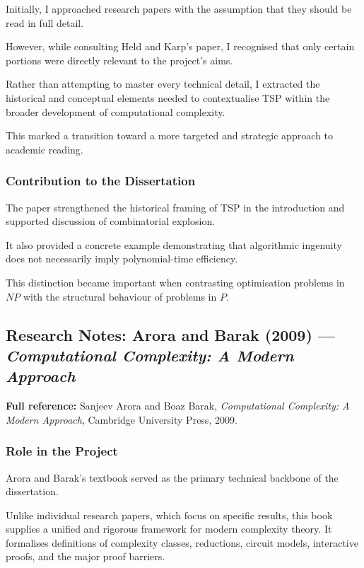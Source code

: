 \documentclass[12pt]{article}
\begin{document}
Initially, I approached research papers with the assumption that they should be read in full detail.

However, while consulting Held and Karp's paper, I recognised that only certain portions were directly relevant to the project's aims.

Rather than attempting to master every technical detail, I extracted the historical and conceptual elements needed to contextualise TSP within the broader development of computational complexity.

This marked a transition toward a more targeted and strategic approach to academic reading.

\subsubsection*{Contribution to the Dissertation}

The paper strengthened the historical framing of TSP in the introduction and supported discussion of combinatorial explosion.

It also provided a concrete example demonstrating that algorithmic ingenuity does not necessarily imply polynomial-time efficiency.

This distinction became important when contrasting optimisation problems in $NP$ with the structural behaviour of problems in $P$.

\subsection{Research Notes: Arora and Barak (2009) --- \textit{Computational Complexity: A Modern Approach}}

\textbf{Full reference:} Sanjeev Arora and Boaz Barak,
\textit{Computational Complexity: A Modern Approach},
Cambridge University Press, 2009.

\subsubsection*{Role in the Project}

Arora and Barak's textbook served as the primary technical backbone of the dissertation.

Unlike individual research papers, which focus on specific results, this book supplies a unified and rigorous framework for modern complexity theory. It formalises definitions of complexity classes, reductions, circuit models, interactive proofs, and the major proof barriers.
\end{document}

